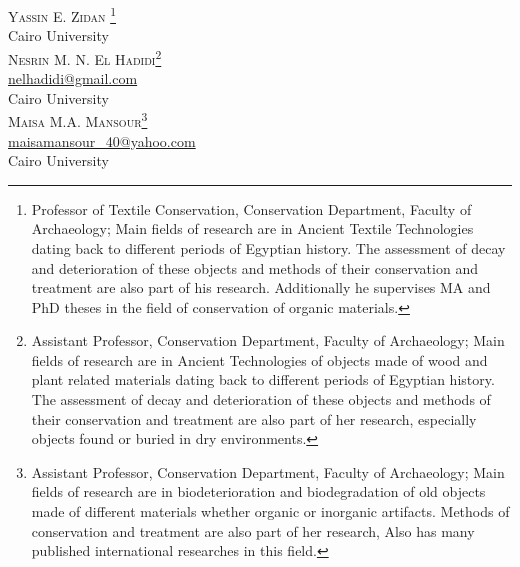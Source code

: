 \openingarticle
\def\ppages{\pagerange{zidan:firstpage}{zidan:lastpage}}
\def\shorttitle{Treatment of Khedive Ismail’s antique gun (1863--1879)}
\def\maintitle{Treatment of Khedive Ismail’s antique gun (1863--1879) at the National Military Museum. A Case Study}
\def\shortauthor{Yassin E. Zidan, Nesrin M. N. El Hadidi, Maisa M.A. Mansour, Wael A.A. Abo Elgat}
\def\authormail{}
\def\affiliation{}
\def\thanknote{}
\begin{center}
	{\Large\scshape Yassin E. Zidan \footnote{Professor of Textile Conservation, Conservation Department, Faculty of Archaeology; Main fields of research are in Ancient Textile Technologies dating back to different periods of Egyptian history. The assessment of decay and deterioration of these objects and methods of their conservation and treatment are also part of his research. Additionally he supervises MA and PhD theses in the field of conservation of organic materials.}}\\  Cairo University\\[1em]
		
	
	{\Large\scshape 	Nesrin M. N. El Hadidi\footnote{Assistant Professor, Conservation Department, Faculty of Archaeology; Main fields of research are in Ancient Technologies of objects made of wood and plant related materials dating back to different periods of Egyptian history. The assessment of decay and deterioration of these objects and methods of their conservation and treatment are also part of her research, especially objects found or buried in dry environments.}}\\	
	\href{mailto:nelhadidi@gmail.com}{nelhadidi@gmail.com}\\
	 Cairo University \\[1em]
	
	
	{\Large\scshape 		Maisa M.A. Mansour\footnote{Assistant Professor, Conservation Department, Faculty of Archaeology; Main fields of research are in biodeterioration and biodegradation of old objects made of different materials whether organic or inorganic artifacts. Methods of conservation and treatment are also part of her research, Also has many published international researches in this field.}}\\ 
\href{mailto:maisamansour_40@yahoo.com}{maisamansour\_40@yahoo.com}\\
Cairo University \\[1em]



\end{center}
